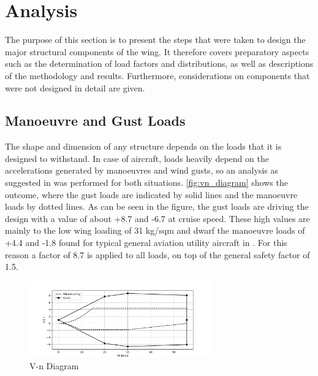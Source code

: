 \section{Analysis}
\label{sec:anal_stru}

The purpose of this section is to present the steps that were taken to design the major structural components of the wing. It therefore covers preparatory aspects such as the determination of load factors and distributions, as well as descriptions of the methodology and results. Furthermore, considerations on components that were not designed in detail are given. 

\subsection{Manoeuvre and Gust Loads}

The shape and dimension of any structure depends on the loads that it is designed to withstand. In case of aircraft, loads heavily depend on the accelerations generated by manoeuvres and wind gusts, so an analysis as suggested in \cite{raymer} was performed for both situations. \autoref{fig:vn_diagram} shows the outcome, where the gust loads are indicated by solid lines and the manoeuvre loads by dotted lines. As can be seen in the figure, the gust loads are driving the design with a value of about +8.7 and -6.7 at cruise speed. These high values are mainly to the low wing loading of 31 kg/sqm and dwarf the manoeuvre loads of +4.4 and -1.8 found for typical general aviation utility aircraft in \cite{raymer}. For this reason a factor of 8.7 is applied to all loads, on top of the general safety factor of 1.5. 

\begin{figure}[H]
    \centering
    \includegraphics[width=0.7\textwidth]{Structures/Figures/vn_diagram}
    \caption{V-n Diagram}
    \label{fig:vn_diagram}
\end{figure}

